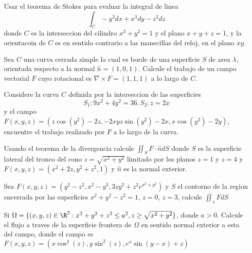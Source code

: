 \documentclass{article}
\begin{document}
\begin{problem}
  Usar el teorema de Stokes para evaluar la integral de linea
  \begin{equation*}
    \int_{C} -y^{3} dx + x^{3} dy - z^{3} dz
  \end{equation*}
  donde $C$ es la interseccion del cilindro $x^{2} + y^{2} = 1$ y el plano $x + y + z = 1$, y la
  orientacoin de $C$ es en sentido contrario a las manecillas del reloj, en el plano $xy$.
\end{problem}

\begin{problem}
  Sea $C$ una curva cerrada simple la cual es borde de una superficie $S$ de area $\lambda$, orientada respecto a la normal $\hat{n} = (1, 0, 1)$. Calcule el trabajo de un campo vectorial
  $F$ cuyo rotacional es $\nabla \times F = (1, 1, 1)$ a lo largo de $C$.
\end{problem}

\begin{problem}
  Considere la curva $C$ definida por la interseccion de las superficies
  \begin{equation*}
    S_{1}: 9x^{2} + 4y^{2} = 36, S_{2} : z = 2x
  \end{equation*}
  y el campo $F(x, y, z) = (z \cos(y^{2}) - 2z, -2xyz \sin(y^{2}) - 2x, x \cos(y^{2}) -2y)$, encuentre el trabajo realizado por $F$ a lo largo de la curva.
\end{problem}

\begin{problem}
  Usando el teorema de la divergencia calcule $\iint_{S} F \cdot \hat{n} dS$ donde $S$ es la superficie lateral
  del tronco del cono $z = \sqrt{x^{2} + y^{2}}$ limitado por los planos $z = 1$ y $z = 4$ y
  $F(x, y, z) = (x^{2} + 2z, y^{2} + z^{2}, 1)$ y $\hat{n}$ es la normal exterior.
\end{problem}

\begin{problem}
  Sea $F(x, y, z) = (y^{2} - z^{2}, x^{2} - y^{3}, 3zy^{2} + z^{2}e^{x^{2} + y^{2}})$ y $S$ el contorno de la region encerrada por las superficies $x^{2} + y^{2} - z^{2} = 1$, $z = 0$, $z = 3$, calcule $\iint_{s} F dS$
\end{problem}

\begin{problem}
Si $\Omega = \{(x, y, z) \in \R^{3} : x^{2} + y^{2} + z^{2} \leq a^{2}, z \geq \sqrt{x^{2} + y^{2}}\}$, donde $a > 0$. Calcule el flujo a traves de la superficie frontera de $\Omega$ en sentido normal exterior a esta del campo, donde el campo es $F(x, y, z) = (x \cos^{2}(z), y \sin^{2}(z), e^{x}\sin(y - x) + z)$
\end{problem}
\end{document}
